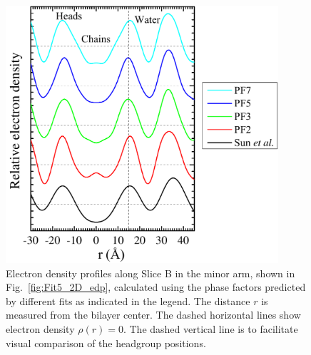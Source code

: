 \begin{figure}[htbp]
  \centering
  \includegraphics[width=0.9\textwidth]{figures/ripple/LAXS/minor_diff_models}
  \caption[Electron density profiles along Slice B in the minor arm, 
  shown in Fig.~\ref{fig:Fit5_2D_edp}, calculated using the phase factors 
  predicted by different fits as indicated in the legend]
  {Electron density profiles along Slice B in the minor arm,
  shown in Fig.~\ref{fig:Fit5_2D_edp}, calculated using the phase factors 
  predicted by different fits as indicated in the legend. 
  The distance $r$ is measured from the bilayer center. 
  The dashed horizontal lines show electron density $\rho(r)=0$.
  The dashed vertical line is to facilitate visual comparison of the headgroup
  positions.}
  \label{fig:minor_diff_models}
\end{figure}





